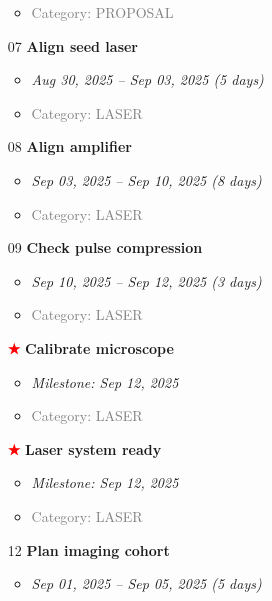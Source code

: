 \documentclass[portrait,a4paper]{article}
\begin{document}
\begin{enumerate}[leftmargin=0pt, itemindent=0pt, labelsep=0pt, labelwidth=0pt]
\begin{itemize}
        \item \textcolor{gray}{Category: PROPOSAL}
    \end{itemize}
\vspace{0.3cm}
\item[07] \textbf{Align seed laser}
    \begin{itemize}
        \item \textit{Aug 30, 2025 -- Sep 03, 2025 (5 days)}
        \item \textcolor{gray}{Category: LASER}
    \end{itemize}
\vspace{0.3cm}
\item[08] \textbf{Align amplifier}
    \begin{itemize}
        \item \textit{Sep 03, 2025 -- Sep 10, 2025 (8 days)}
        \item \textcolor{gray}{Category: LASER}
    \end{itemize}
\vspace{0.3cm}
\item[09] \textbf{Check pulse compression}
    \begin{itemize}
        \item \textit{Sep 10, 2025 -- Sep 12, 2025 (3 days)}
        \item \textcolor{gray}{Category: LASER}
    \end{itemize}
\vspace{0.3cm}
\item[\textcolor{red}{\textbf{★}}] \textbf{Calibrate microscope}
    \begin{itemize}
        \item \textit{Milestone: Sep 12, 2025}
        \item \textcolor{gray}{Category: LASER}
    \end{itemize}
\vspace{0.3cm}
\item[\textcolor{red}{\textbf{★}}] \textbf{Laser system ready}
    \begin{itemize}
        \item \textit{Milestone: Sep 12, 2025}
        \item \textcolor{gray}{Category: LASER}
    \end{itemize}
\vspace{0.3cm}
\item[12] \textbf{Plan imaging cohort}
    \begin{itemize}
        \item \textit{Sep 01, 2025 -- Sep 05, 2025 (5 days)}

\end{itemize}
\end{enumerate}
\end{document}
